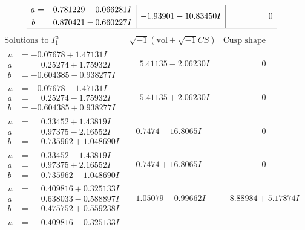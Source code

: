 \documentclass[1p]{elsarticle_modified}
\theoremstyle{definition}
\newcommand{\I}{\sqrt{-1}}
\begin{document}
$$\begin{array}{c|c|c}
\begin{aligned}
a &= -0.781229 - 0.066281 I \\
b &= \phantom{-}0.870421 - 0.660227 I\end{aligned}
 & -1.93901 - 10.83450 I & \phantom{-0.000000 } 0\\
 \hline 
 \end{array}$$\newpage$$\begin{array}{c|c|c}  
\text{Solutions to }I^u_{1}& \I (\text{vol} + \sqrt{-1}CS) & \text{Cusp shape}\\
 \hline 
\begin{aligned}
u &= -0.07678 + 1.47131 I \\
a &= \phantom{-}0.25274 + 1.75932 I \\
b &= -0.604385 - 0.938277 I\end{aligned}
 & \phantom{-}5.41135 - 2.06230 I & \phantom{-0.000000 } 0 \\ \hline\begin{aligned}
u &= -0.07678 - 1.47131 I \\
a &= \phantom{-}0.25274 - 1.75932 I \\
b &= -0.604385 + 0.938277 I\end{aligned}
 & \phantom{-}5.41135 + 2.06230 I & \phantom{-0.000000 } 0 \\ \hline\begin{aligned}
u &= \phantom{-}0.33452 + 1.43819 I \\
a &= \phantom{-}0.97375 - 2.16552 I \\
b &= \phantom{-}0.735962 + 1.048690 I\end{aligned}
 & -0.7474 - 16.8065 I & \phantom{-0.000000 } 0 \\ \hline\begin{aligned}
u &= \phantom{-}0.33452 - 1.43819 I \\
a &= \phantom{-}0.97375 + 2.16552 I \\
b &= \phantom{-}0.735962 - 1.048690 I\end{aligned}
 & -0.7474 + 16.8065 I & \phantom{-0.000000 } 0 \\ \hline\begin{aligned}
u &= \phantom{-}0.409816 + 0.325133 I \\
a &= \phantom{-}0.638033 - 0.588897 I \\
b &= \phantom{-}0.475752 + 0.559238 I\end{aligned}
 & -1.05079 - 0.99662 I & -8.88984 + 5.17874 I \\ \hline\begin{aligned}
u &= \phantom{-}0.409816 - 0.325133 I \\

\end{aligned}
\end{array}$$
\end{document}
